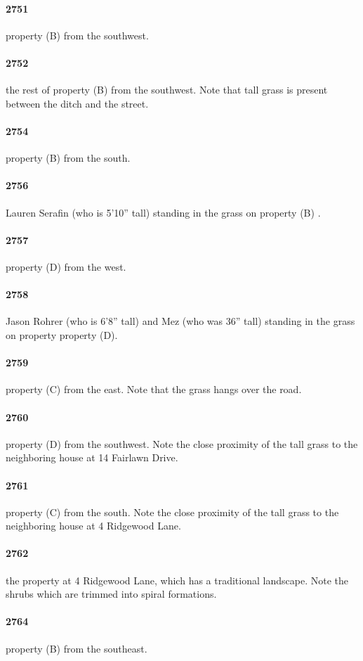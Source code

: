 \documentclass[12pt]{article}
\begin{document}
\paragraph{2751} property (B) from the southwest.
\paragraph{2752} the rest of property (B) from the southwest.  Note that tall grass is present between the ditch and the street.
\paragraph{2754} property (B) from the south.
\paragraph{2756} Lauren Serafin (who is 5'10'' tall) standing in the grass on property (B) .
\paragraph{2757} property (D) from the west.
\paragraph{2758} Jason Rohrer (who is 6'8'' tall) and Mez (who was 36'' tall) standing in the grass on property property (D).
\paragraph{2759} property (C) from the east.  Note that the grass hangs over the road.
\paragraph{2760} property (D) from the southwest.  Note the close proximity of the tall grass to the neighboring house at 14 Fairlawn Drive.
\paragraph{2761} property (C) from the south.  Note the close proximity of the tall grass to the neighboring house at 4 Ridgewood Lane.
\paragraph{2762} the property at 4 Ridgewood Lane, which has a traditional landscape.  Note the shrubs which are trimmed into spiral formations.
\paragraph{2764} property (B) from the southeast.
\end{document}
